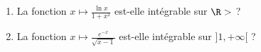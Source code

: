 \begin{enonce}
\begin{exercise}[ID={RMS121-2 E1058 (CCP)},subtitle={},tags={}, difficulty={0}]
\begin{enumerate}
\item La fonction $x\mapsto \frac{\ln x}{1+x^2}$ est-elle intégrable sur $\R>$ ?
\item La fonction $x\mapsto\frac{e^{-x}}{\sqrt{x-1}}$ est-elle intégrable sur $]1,+\infty[$ ?
\end{enumerate}
\end{exercise}
\begin{solution}
\end{solution}
\end{enonce}

